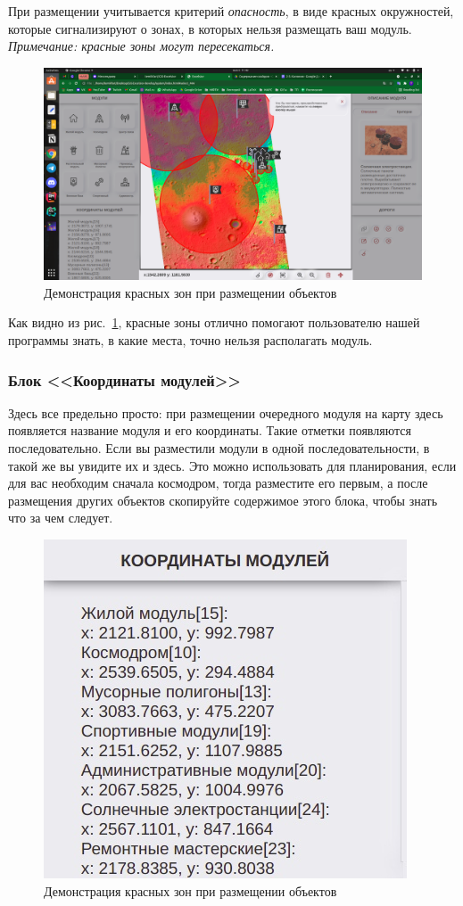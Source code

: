 При размещении учитывается критерий \textit{опасность}, в виде красных окружностей, которые сигнализируют о зонах, в которых нельзя размещать ваш модуль. \textit{Примечание: красные зоны могут пересекаться.}

\begin{figure}[h!]
	\centering
	\includegraphics[width=.7\linewidth]{./img/red_zones}
	\caption{Демонстрация красных зон при размещении объектов}\label{fig:red_zones}
\end{figure}

Как видно из рис.~\ref{fig:red_zones}, красные зоны отлично помогают пользователю нашей программы знать, в какие места, точно нельзя располагать модуль.



\subsubsection{Блок <<Координаты модулей>>}

Здесь все предельно просто: при размещении очередного модуля на карту здесь появляется название модуля и его координаты. Такие отметки появляются последовательно. Если вы разместили модули в одной последовательности, в такой же вы увидите их и здесь. Это можно использовать для планирования, если для вас необходим сначала космодром, тогда разместите его первым, а после размещения других объектов скопируйте содержимое этого блока, чтобы знать что за чем следует.

\begin{figure}[h!]
	\centering
	\includegraphics[width=.5\linewidth]{./img/module_coordinates}
	\caption{Демонстрация красных зон при размещении объектов}\label{fig:module_coordinates}
\end{figure}

